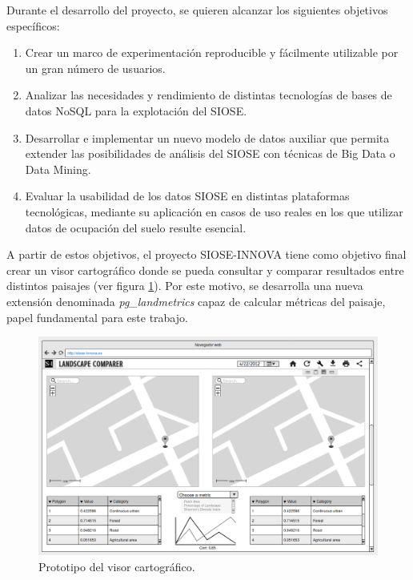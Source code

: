 \begin{prologo}
Durante el desarrollo del proyecto, se quieren alcanzar los siguientes objetivos específicos:
\begin{enumerate}
\item Crear un marco de experimentación reproducible y fácilmente utilizable por un gran número de usuarios.
\item Analizar las necesidades y rendimiento de distintas tecnologías de bases de datos NoSQL para la explotación del SIOSE.
\item Desarrollar e implementar un nuevo modelo de datos auxiliar que permita extender las posibilidades de análisis del SIOSE con técnicas de Big Data o Data Mining.
\item Evaluar la usabilidad de los datos SIOSE en distintas plataformas tecnológicas, mediante su aplicación en casos de uso reales en los que utilizar datos de ocupación del suelo resulte esencial.
\end{enumerate}

A partir de estos objetivos, el proyecto SIOSE-INNOVA tiene como objetivo final crear un visor cartográfico donde se pueda consultar y comparar resultados entre distintos paisajes (ver figura \ref{fig:visorweb}). Por este motivo, se desarrolla una nueva extensión denominada \textit{pg\_landmetrics} capaz de calcular métricas del paisaje, papel fundamental para este trabajo.

\begin{figure}
\begin{center}
\includegraphics[width=\textwidth]{Prologo/Figs/visorweb.png}
\caption{Prototipo del visor cartográfico. \label{fig:visorweb}}
\end{center}
\end{figure}


\end{prologo}
